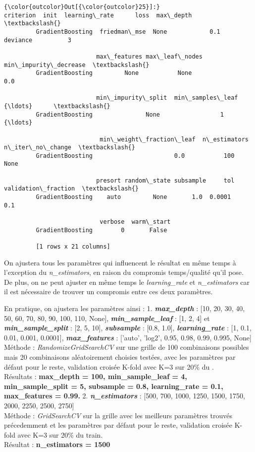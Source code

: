 \documentclass[11pt]{article}
\begin{document}
\begin{Verbatim}[commandchars=\\\{\}]
{\color{outcolor}Out[{\color{outcolor}25}]:}                      criterion  init  learning\_rate      loss  max\_depth  \textbackslash{}
         GradientBoosting  friedman\_mse  None            0.1  deviance          3   
         
                          max\_features max\_leaf\_nodes  min\_impurity\_decrease  \textbackslash{}
         GradientBoosting         None           None                    0.0   
         
                          min\_impurity\_split  min\_samples\_leaf     {\ldots}      \textbackslash{}
         GradientBoosting               None                 1     {\ldots}       
         
                           min\_weight\_fraction\_leaf  n\_estimators  n\_iter\_no\_change  \textbackslash{}
         GradientBoosting                       0.0           100              None   
         
                          presort random\_state subsample     tol  validation\_fraction  \textbackslash{}
         GradientBoosting    auto         None       1.0  0.0001                  0.1   
         
                           verbose  warm\_start  
         GradientBoosting        0       False  
         
         [1 rows x 21 columns]
\end{Verbatim}
            
    On ajustera tous les paramètres qui influencent le résultat en même
temps à l'exception du \emph{n\_estimators}, en raison du compromis
temps/qualité qu'il pose. De plus, on ne peut ajuster en même temps le
\emph{learning\_rate} et \emph{n\_estimators} car il est nécessaire de
trouver un compromis entre ces deux paramètres.

En pratique, on ajustera les paramètres ainsi : 1.
\textbf{\emph{max\_depth}} : {[}10, 20, 30, 40, 50, 60, 70, 80, 90, 100,
110, None{]}, \textbf{\emph{min\_sample\_leaf}} : {[}1, 2, 4{]} et
\textbf{\emph{min\_sample\_split}} : {[}2, 5, 10{]},
\textbf{\emph{subsample}} : {[}0.8, 1.0{]},
\textbf{\emph{learning\_rate}} : {[}1, 0.1, 0.01, 0.001, 0.0001{]},
\textbf{\emph{max\_features}} : {[}'auto', 'log2', 0.95, 0.98, 0.99,
0.995, None{]}\\
Méthode : \emph{RandomizeGridSearchCV} sur une grille de 100
combinaisons possibles mais 20 combinaisons aléatoirement choisies
testées, avec les paramètres par défaut pour le reste, validation
croisée K-fold avec K=3 sur 20\% du .\\
Résultats : \textbf{max\_depth = 100, min\_sample\_leaf = 4,
min\_sample\_split = 5, subsample = 0.8, learning\_rate = 0.1,
max\_features = 0.99.} 2. \textbf{\emph{n\_estimators}} : {[}500, 700,
1000, 1250, 1500, 1750, 2000, 2250, 2500, 2750{]}\\
Méthode : \emph{GridSearchCV} sur la grille avec les meilleurs
paramètres trouvés précedemment et les paramètres par défaut pour le
reste, validation croisée K-fold avec K=3 sur 20\% du train.\\
Résultat : \textbf{n\_estimators = 1500}
\end{document}
